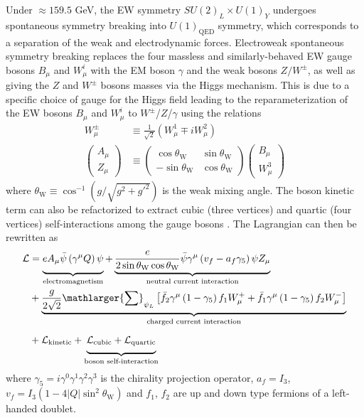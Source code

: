 \documentclass[../thesis.tex]{subfiles}
\begin{document}
Under $\approx 159.5$ GeV, the \acs{EW} symmetry $SU(2)_L\times U(1)_Y$ undergoes spontaneous symmetry breaking \citep{theory:ew_scale} into $U(1)_\text{QED}$ symmetry, which corresponds to a separation of the weak and electrodynamic forces. Electroweak spontaneous symmetry breaking replaces the four massless and similarly-behaved \acs{EW} gauge bosons $B_\mu$ and $W_\mu^i$ with the \acs{EM} boson $\gamma$ and the weak bosons $Z/W^\pm$, as well as giving the $Z$ and $W^\pm$ bosons masses via the Higgs mechanism. This is due to a specific choice of gauge for the Higgs field leading to the reparameterization of the \acs{EW} bosons $B_\mu$ and $W_\mu^i$ to $W^\pm$/$Z$/$\gamma$ using the relations
\begin{equation}
\begin{aligned}
\label{eq:EW_repara}
W^\pm_\mu &\equiv \frac{1}{\sqrt{2}}\left(W^1_\mu \mp iW^2_\mu\right) \\ 
\begin{pmatrix}
A_\mu \\ Z_\mu
\end{pmatrix}
&\equiv \begin{pmatrix}
\cos \theta_\text{W} & \sin \theta_\text{W} \\
-\sin \theta_\text{W} & \cos \theta_\text{W}
\end{pmatrix}
\begin{pmatrix}
B_\mu \\ W_\mu^3
\end{pmatrix}
\end{aligned}
\end{equation}
where $\theta_\text{W}\equiv\cos^{-1}\left(g/\sqrt{g^2+g'^2}\right)$ is the weak mixing angle. The boson kinetic term can also be refactorized to extract cubic (three vertices) and quartic (four vertices) self-interactions among the gauge bosons \citep{theory:ew}. The Lagrangian can then be rewritten as
\begin{equation}
\begin{aligned}
\label{eq:EW_L}
\mathcal{L} &=
\underbrace{\vphantom{\displaystyle\frac{e}{2\sin\theta_\text{W}}}
eA_\mu\bar{\psi}\left(\gamma^\mu Q\right)\psi
}_\text{electromagnetism}
+\underbrace{
\displaystyle\frac{e}{2\sin\theta_\text{W}\cos\theta_\text{W}}\bar{\psi}\gamma^\mu\left(v_f-a_f\gamma_5 \right)\psi Z_\mu
}_\text{neutral current interaction} \\
&+\underbrace{
\displaystyle\frac{g}{2\sqrt{2}}\mathlarger{\sum}_{\psi_L}
\left[ \bar{f}_2\gamma^\mu\left(1-\gamma_5\right)f_1 W_\mu^+ + \bar{f}_1\gamma^\mu\left(1-\gamma_5\right)f_2 W_\mu^- \right]
}_\text{charged current interaction} \\
&+\mathcal{L}_\text{kinetic}+\underbrace{\vphantom{\frac{1}{4}}
\mathcal{L}_\text{cubic}+\mathcal{L}_\text{quartic}
}_\text{boson self-interaction}
\end{aligned}
\end{equation}
where $\gamma_5=i\gamma^0\gamma^1\gamma^2\gamma^3$ is the chirality projection operator, $a_f=I_3$, $v_f=I_3(1-4|Q|\sin^2\theta_\text{W})$ and $f_1$, $f_2$ are up and down type fermions of a left-handed doublet.
\end{document}
